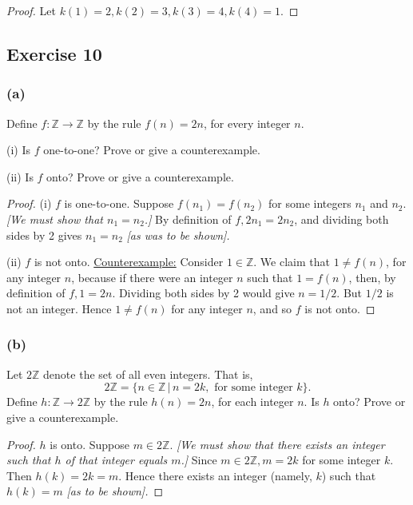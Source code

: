 \documentclass[14pt]{extarticle}
\newcommand{\Z}{\mathbb{Z}}
\begin{document}
\begin{proof}
    Let \(k(1) = 2, k(2) = 3, k(3) = 4, k(4) = 1\).
\end{proof}

\subsection{Exercise 10}
\subsubsection{(a)}
Define \(f: \Z \to \Z\) by the rule \(f(n) = 2n\), for every integer $n$.

(i) Is $f$ one-to-one? Prove or give a counterexample.

(ii) Is $f$ onto? Prove or give a counterexample.

\begin{proof}
    (i) $f$ is one-to-one. Suppose \(f(n_1) = f(n_2)\) for some integers $n_1$ and $n_2$. {\it [We must show that \(n_1 =
                n_2\).]} By definition of \(f, 2n_1 = 2n_2\), and dividing both sides by 2 gives $n_1 = n_2$ {\it [as was to be shown].}

    (ii) $f$ is not onto. \underline{Counterexample:} Consider \(1 \in \Z\). We claim that \(1 \neq f(n)\), for any
    integer $n$, because if there were an integer $n$ such that \(1 = f(n)\), then, by definition of \(f, 1 = 2n\).
    Dividing both sides by 2 would give \(n = 1/2\). But $1/2$ is not an integer. Hence \(1 \neq f(n)\) for any integer
    $n$, and so $f$ is not onto.
\end{proof}

\subsubsection{(b)}
Let $2\Z$ denote the set of all even integers. That is,
\[
    2\Z = \{n \in \Z \,|\,n=2k, \text{ for some integer } k\}.
\]
Define \(h: \Z \to 2\Z\) by the rule \(h(n) = 2n\), for each integer $n$. Is $h$ onto? Prove or give a counterexample.

\begin{proof}
    $h$ is onto. Suppose \(m \in 2\Z\). {\it [We must show that there exists an integer such that $h$ of that integer
                equals $m$.]} Since \(m \in 2\Z, m = 2k\) for some integer $k$. Then \(h(k) = 2k = m\). Hence there exists an integer
    (namely, $k$) such that \(h(k) = m\) {\it [as to be shown].}
\end{proof}
\end{document}
